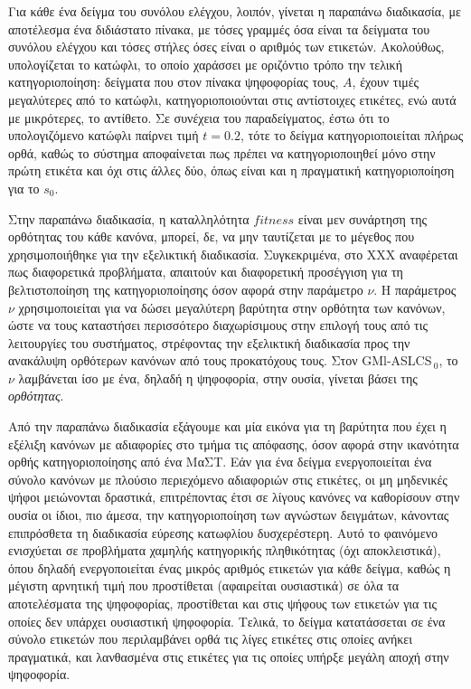 Για κάθε ένα δείγμα του συνόλου ελέγχου, λοιπόν, γίνεται η παραπάνω διαδικασία, με αποτέλεσμα ένα διδιάστατο πίνακα, με τόσες γραμμές όσα είναι τα δείγματα του συνόλου ελέγχου και τόσες στήλες όσες είναι ο αριθμός των ετικετών. Ακολούθως, υπολογίζεται το κατώφλι, το οποίο χαράσσει με οριζόντιο τρόπο  την τελική κατηγοριοποίηση: δείγματα που στον πίνακα ψηφοφορίας τους, $A$, έχουν τιμές μεγαλύτερες από το κατώφλι, κατηγοριοποιούνται στις αντίστοιχες ετικέτες, ενώ αυτά με μικρότερες, το αντίθετο. Σε συνέχεια του παραδείγματος, έστω ότι το υπολογιζόμενο κατώφλι παίρνει τιμή $t = 0.2$, τότε το δείγμα κατηγοριοποιείται πλήρως ορθά, καθώς το σύστημα αποφαίνεται πως πρέπει να κατηγοριοποιηθεί μόνο στην πρώτη ετικέτα και όχι στις άλλες δύο, όπως είναι και η πραγματική κατηγοριοποίηση για το $s_{0}$.


Στην παραπάνω διαδικασία, η καταλληλότητα $fitness$ είναι μεν συνάρτηση της ορθότητας του κάθε κανόνα, μπορεί, δε, να μην ταυτίζεται με το μέγεθος που χρησιμοποιήθηκε για την εξελικτική διαδικασία. Συγκεκριμένα, στο ΧΧΧ αναφέρεται πως διαφορετικά προβλήματα, απαιτούν και διαφορετική προσέγγιση για τη βελτιστοποίηση της κατηγοριοποίησης όσον αφορά στην παράμετρο $\nu$. Η παράμετρος $\nu$ χρησιμοποιείται για να δώσει μεγαλύτερη βαρύτητα στην ορθότητα των κανόνων, ώστε να τους καταστήσει περισσότερο διαχωρίσιμους στην επιλογή τους από τις λειτουργίες του συστήματος, στρέφοντας την εξελικτική διαδικασία προς την ανακάλυψη ορθότερων κανόνων από τους προκατόχους τους. Στον GMl-ASLCS$_{\:0}$, το $\nu$ λαμβάνεται ίσο με ένα, δηλαδή η ψηφοφορία, στην ουσία, γίνεται βάσει της \emph{ορθότητας}.


Από την παραπάνω διαδικασία εξάγουμε και μία εικόνα για τη βαρύτητα που έχει η εξέλιξη κανόνων με αδιαφορίες στο τμήμα τις απόφασης, όσον αφορά στην ικανότητα ορθής κατηγοριοποίησης από ένα ΜαΣΤ. Εάν για ένα δείγμα ενεργοποιείται ένα σύνολο κανόνων με πλούσιο περιεχόμενο αδιαφοριών στις ετικέτες, οι μη μηδενικές ψήφοι μειώνονται δραστικά, επιτρέποντας έτσι σε λίγους κανόνες να καθορίσουν στην ουσία οι ίδιοι, πιο άμεσα, την κατηγοριοποίηση των αγνώστων δειγμάτων, κάνοντας επιπρόσθετα τη διαδικασία εύρεσης κατωφλίου δυσχερέστερη. Αυτό το φαινόμενο ενισχύεται σε προβλήματα χαμηλής κατηγορικής πληθικότητας (όχι αποκλειστικά), όπου δηλαδή ενεργοποιείται ένας μικρός αριθμός ετικετών για κάθε δείγμα, καθώς η μέγιστη αρνητική τιμή που προστίθεται (αφαιρείται ουσιαστικά) σε όλα τα αποτελέσματα της ψηφοφορίας, προστίθεται και στις ψήφους των ετικετών για τις οποίες δεν υπάρχει ουσιαστική ψηφοφορία. Τελικά, το δείγμα κατατάσσεται σε ένα σύνολο ετικετών που περιλαμβάνει ορθά τις λίγες ετικέτες στις οποίες ανήκει πραγματικά, και λανθασμένα στις ετικέτες για τις οποίες υπήρξε μεγάλη αποχή στην ψηφοφορία.


